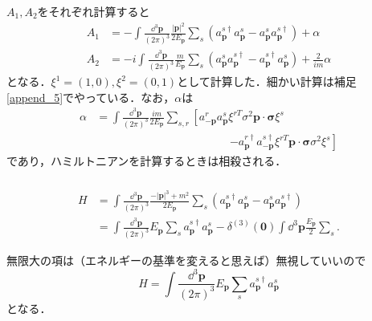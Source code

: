 \documentclass[pdflatex,unicode,ja=standard,12pt]{beamer}
\begin{document}
\begin{frame}%

  \frametitle{\subsecname}

  $A_1,A_2$をそれぞれ計算すると
  \begin{align}
    A_1
    &=
    -
    \int\frac{\dd^3\mathbf{p}}{(2\pi)^3}
    \frac{|\mathbf{p}|^2}{2E_{\mathbf{p}}}
    \sum_{s}
    (
      a_{\mathbf{p}}^{s\dag}a_{\mathbf{p}}^{s}
      -
      a_{\mathbf{p}}^{s}a_{\mathbf{p}}^{s\dag}
    )
    +
    \alpha
    \label{a_1}
    \\
    A_2
    &=
    -i
    \int\frac{\dd^3\mathbf{p}}{(2\pi)^3}
    \frac{m}{E_{\mathbf{p}}}
    \sum_{s}
    (      
      a_{\mathbf{p}}^{s}a_{\mathbf{p}}^{s\dag}
      -
      a_{\mathbf{p}}^{s\dag}a_{\mathbf{p}}^{s}
    )
    +
    \frac{2}{im}\alpha
    \label{a_23}
  \end{align}
  となる．$\xi^1=(1,0),\xi^2=(0,1)$として計算した．細かい計算は補足\ref{append_5}でやっている．なお，$\alpha$は
  \begin{align}
    \alpha
    &=
    \int
    \frac{\dd^3\mathbf{p}}{(2\pi)^3}
    \frac{im}{2E_{\mathbf{p}}}
    \sum_{s,r}
    \left[  
      a_{-\mathbf{p}}^ra_{\mathbf{p}}^s
      \xi^{rT}\sigma^2\mathbf{p}\cdot\bm{\sigma}\xi^s
    \right.
    \nonumber
    \\
    &\hspace{5cm}
    \left.
      -
      a_{\mathbf{p}}^{r\dag}a_{-\mathbf{p}}^{s\dag}
      \xi^{rT}\mathbf{p}\cdot\bm{\sigma}\sigma^2\xi^s      
    \right]
  \end{align}
  であり，ハミルトニアンを計算するときは相殺される．

\end{frame}

\begin{frame}%

  \frametitle{\subsecname}

  \begin{align}
    H
    &=
    \int\frac{\dd^3\mathbf{p}}{(2\pi)^3}
    \frac{-|\mathbf{p}|^3+m^2}{2E_{\mathbf{p}}}
    \sum_{s}
    (
      a_{\mathbf{p}}^{s\dag}a_{\mathbf{p}}^{s}
      -
      a_{\mathbf{p}}^{s}a_{\mathbf{p}}^{s\dag}
    )
    \nonumber
    \\
    &=
    \int\frac{\dd^3\mathbf{p}}{(2\pi)^3}E_{\mathbf{p}}
    \sum_{s}a_{\mathbf{p}}^{s\dag}a_{\mathbf{p}}^{s}
    -
    \delta^{(3)}(\mathbf{0})\int\dd^3\mathbf{p}\frac{E_{\mathbf{p}}}{2}\sum_{s}
    .
  \end{align}
  
  無限大の項は（エネルギーの基準を変えると思えば）無視していいので
  \begin{equation}
    H
    =    
    \int\frac{\dd^3\mathbf{p}}{(2\pi)^3}E_{\mathbf{p}}
    \sum_{s}a_{\mathbf{p}}^{s\dag}a_{\mathbf{p}}^{s}
  \end{equation}
  となる．

\end{frame}
\end{document}
